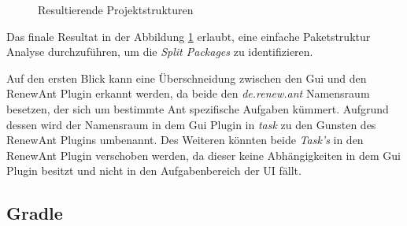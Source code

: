 	\begin{figure}[h!]
		\centering
		\footnotesize
		\setlength{\DTbaselineskip}{10pt}
		\begin{minipage}{.45\textwidth}
		\end{minipage}
		\begin{minipage}{.5\textwidth}
		\end{minipage}
	  \caption{Resultierende Projektstrukturen}
	  \label{fig:resultStr}
	\end{figure}

	Das finale Resultat in der Abbildung \ref{fig:resultStr} erlaubt, eine einfache Paketstruktur Analyse durchzuführen, um die \textit{Split Packages} zu identifizieren. \bigbreak

	Auf den ersten Blick kann eine Überschneidung zwischen den Gui und den RenewAnt Plugin erkannt werden, da beide den \textit{de.renew.ant} Namensraum besetzen, der sich um bestimmte Ant spezifische Aufgaben kümmert. Aufgrund dessen wird der Namensraum in dem Gui Plugin in \textit{task} zu den Gunsten des RenewAnt Plugins umbenannt. Des Weiteren könnten beide \textit{Task's} in den RenewAnt Plugin verschoben werden, da dieser keine Abhängigkeiten in dem Gui Plugin besitzt und nicht in den Aufgabenbereich der UI fällt. 

\subsection{Gradle}

